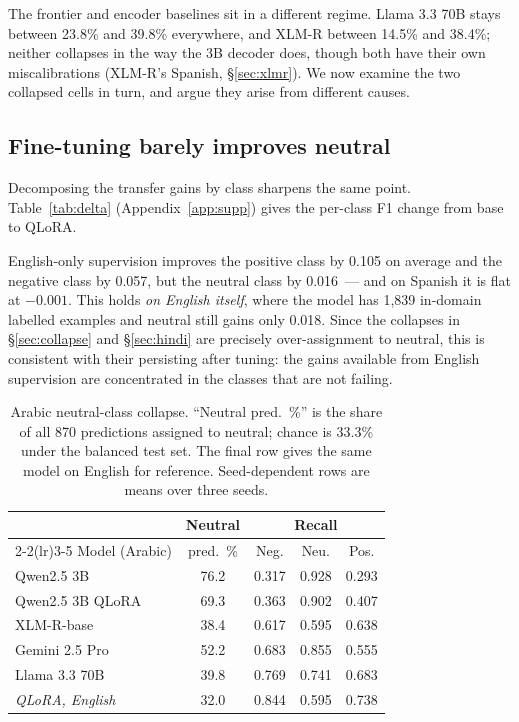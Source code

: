 \documentclass[11pt]{article}
\begin{document}
The frontier and encoder baselines sit in a different regime. Llama 3.3 70B stays
between 23.8\% and 39.8\% everywhere, and \mbox{XLM-R} between 14.5\% and 38.4\%; neither collapses in the
way the 3B decoder does, though both have their own miscalibrations (\mbox{XLM-R}'s
Spanish, \S\ref{sec:xlmr}). We now examine the two collapsed cells in turn, and
argue they arise from different causes.


\subsection{Fine-tuning barely improves neutral}
\label{sec:perclass}

Decomposing the transfer gains by class sharpens the same point.
Table~\ref{tab:delta} (Appendix~\ref{app:supp}) gives the per-class F1 change from base to QLoRA.

English-only supervision improves the positive class by 0.105 on average and the
negative class by 0.057, but the neutral class by 0.016~--- and on Spanish it is
flat at $-0.001$. This holds \emph{on English itself}, where the model has 1{,}839
in-domain labelled examples and neutral still gains only 0.018. Since the collapses in \S\ref{sec:collapse} and
\S\ref{sec:hindi} are precisely over-assignment to neutral, this is consistent with
their persisting after tuning: the gains available from English supervision are
concentrated in the classes that are not failing.

\begin{table}[H]
\centering\small
\setlength{\tabcolsep}{4pt}
\begin{tabular}{@{}lcccc@{}}
\toprule
& \multicolumn{1}{c}{Neutral} & \multicolumn{3}{c}{Recall} \\
\cmidrule(lr){2-2}\cmidrule(lr){3-5}
Model (Arabic) & pred.\ \% & Neg. & Neu. & Pos. \\
\midrule
Qwen2.5 3B        & 76.2 & 0.317 & 0.928 & 0.293 \\
Qwen2.5 3B QLoRA  & 69.3 & 0.363 & 0.902 & 0.407 \\
\mbox{XLM-R}-base        & 38.4 & 0.617 & 0.595 & 0.638 \\
Gemini 2.5 Pro    & 52.2 & 0.683 & 0.855 & 0.555 \\
Llama 3.3 70B     & 39.8 & 0.769 & 0.741 & 0.683 \\
\midrule
\textit{QLoRA, English} & 32.0 & 0.844 & 0.595 & 0.738 \\
\bottomrule
\end{tabular}
\caption{Arabic neutral-class collapse. ``Neutral pred.~\%'' is the share of all
870 predictions assigned to neutral; chance is 33.3\% under the balanced test set.
The final row gives the same model on English for reference. Seed-dependent rows
are means over three seeds.}
\label{tab:collapse}
\end{table}
\end{document}
